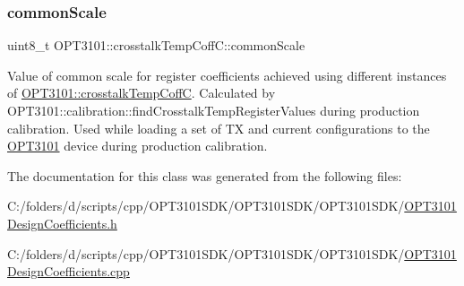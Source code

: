 \subsubsection{\texorpdfstring{common\+Scale}{commonScale}}
{\footnotesize\ttfamily uint8\+\_\+t O\+P\+T3101\+::crosstalk\+Temp\+Coff\+C\+::common\+Scale}



Value of common scale for register coefficients achieved using different instances of \mbox{\hyperlink{class_o_p_t3101_1_1crosstalk_temp_coff_c}{O\+P\+T3101\+::crosstalk\+Temp\+CoffC}}. Calculated by O\+P\+T3101\+::calibration\+::find\+Crosstalk\+Temp\+Register\+Values during production calibration. Used while loading a set of TX and current configurations to the \mbox{\hyperlink{namespace_o_p_t3101}{O\+P\+T3101}} device during production calibration. 



The documentation for this class was generated from the following files\+:\begin{DoxyCompactItemize}
\item 
C\+:/folders/d/scripts/cpp/\+O\+P\+T3101\+S\+D\+K/\+O\+P\+T3101\+S\+D\+K/\+O\+P\+T3101\+S\+D\+K/\mbox{\hyperlink{_o_p_t3101_design_coefficients_8h}{O\+P\+T3101\+Design\+Coefficients.\+h}}\item 
C\+:/folders/d/scripts/cpp/\+O\+P\+T3101\+S\+D\+K/\+O\+P\+T3101\+S\+D\+K/\+O\+P\+T3101\+S\+D\+K/\mbox{\hyperlink{_o_p_t3101_design_coefficients_8cpp}{O\+P\+T3101\+Design\+Coefficients.\+cpp}}\end{DoxyCompactItemize}
